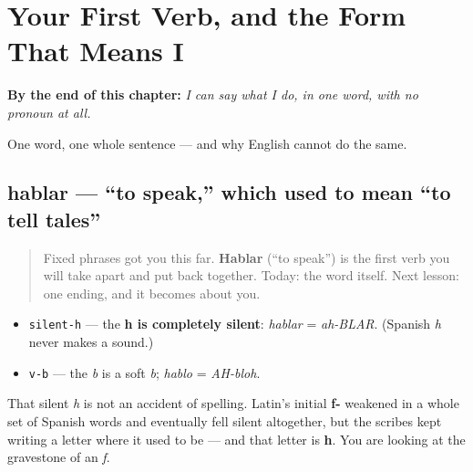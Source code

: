 
\chapter{Your First Verb, and the Form That Means I}
\label{ch:first-verb}

\begin{chapteropening}
\textbf{By the end of this chapter:} \emph{I can say what I do, in one word, with no pronoun at all.}

One word, one whole sentence — and why English cannot do the same.
\end{chapteropening}

\section[hablar]{hablar — \textquotedblleft{}to speak,\textquotedblright{} which used to mean \textquotedblleft{}to tell tales\textquotedblright{}}

\label{lesson:ES-C06-hablar}



\begin{quote}
Fixed phrases got you this far. \textbf{Hablar} (\textquotedblleft{}to speak\textquotedblright{}) is the first verb you will take apart and put back together. Today: the word itself. Next lesson: one ending, and it becomes about you.
\end{quote}

\begin{sounds}
\begin{itemize}
\raggedright
  \item \texttt{silent-h} — the \textbf{h is completely silent}: \emph{hablar} = \emph{ah-BLAR}. (Spanish \emph{h} never makes a sound.)
  \item \texttt{v-b} — the \emph{b} is a soft \emph{b}; \emph{hablo} = \emph{AH-bloh}.
\end{itemize}

That silent \emph{h} is not an accident of spelling. Latin's initial \textbf{f-} weakened in a whole set of Spanish words and eventually fell silent altogether, but the scribes kept writing a letter where it used to be — and that letter is \textbf{h}. You are looking at the gravestone of an \emph{f}.
\end{sounds}

